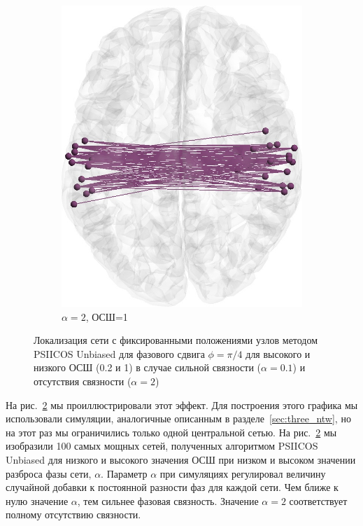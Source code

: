 \begin{figure}[htbp]
\begin{subfigure}[t]{0.24\textwidth}
        \includegraphics[width=0.99\linewidth]{../images/loreta_brain_jitter_2_snr_1_phase_lag_07854.jpg}
        \caption{$\alpha=2$, ОСШ=1}\label{fig:unbiased_1_ntw_d}
    \end{subfigure}
    \caption{Локализация сети с фиксированными положениями узлов методом PSIICOS Unbiased для 
    фазового сдвига $\phi=\pi/4$ для высокого и низкого ОСШ (0.2 и 1) в
    случае сильной связности ($\alpha=0.1$) и отсутствия связности ($\alpha=2$)}\label{fig:unbiased_breaks_in_high_snr}
\end{figure}

На рис.~\ref{fig:unbiased_breaks_in_high_snr} мы проиллюстрировали этот эффект.
Для построения этого графика мы использовали симуляции, аналогичные описанным в
разделе~\ref{sec:three_ntw}, но на этот раз мы ограничились только одной
центральной сетью. На рис.~\ref{fig:unbiased_breaks_in_high_snr} мы изобразили
100 самых мощных сетей, полученных алгоритмом PSIICOS Unbiased для низкого и
высокого значения ОСШ при низком и высоком значении разброса фазы сети, $\alpha$.
Параметр $\alpha$ при симуляциях регулировал величину случайной добавки к постоянной
разности фаз для каждой сети. Чем ближе к нулю значение $\alpha$, тем сильнее
фазовая связность. Значение $\alpha=2$ соответствует полному отсутствию связности.

